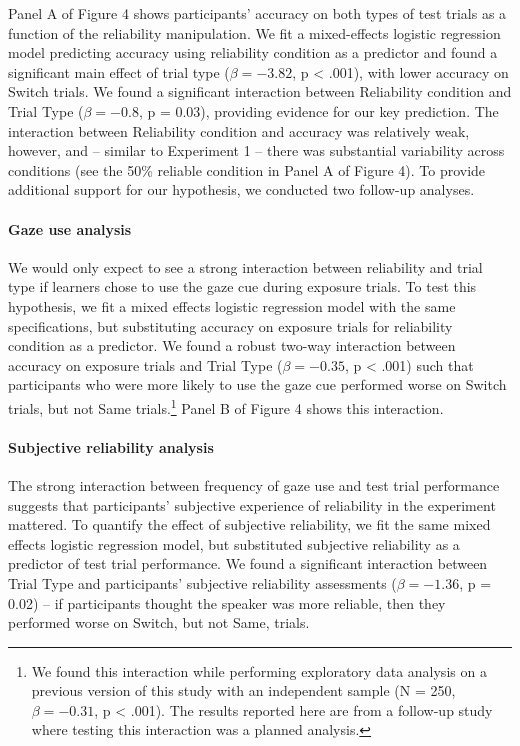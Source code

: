 \documentclass[authoryear, review]{elsarticle}
\begin{document}
Panel A of Figure 4 shows participants' accuracy on both types of test
trials as a function of the reliability manipulation. We fit a
mixed-effects logistic regression model predicting accuracy using
reliability condition as a predictor and found a significant main effect
of trial type (\(\beta = -3.82\), p \textless{} .001), with lower
accuracy on Switch trials. We found a significant interaction between
Reliability condition and Trial Type (\(\beta = -0.8\), p = 0.03),
providing evidence for our key prediction. The interaction between
Reliability condition and accuracy was relatively weak, however, and --
similar to Experiment 1 -- there was substantial variability across
conditions (see the 50\% reliable condition in Panel A of Figure 4). To
provide additional support for our hypothesis, we conducted two
follow-up analyses.

\paragraph{Gaze use analysis}\label{gaze-use-analysis}

We would only expect to see a strong interaction between reliability and
trial type if learners chose to use the gaze cue during exposure trials.
To test this hypothesis, we fit a mixed effects logistic regression
model with the same specifications, but substituting accuracy on
exposure trials for reliability condition as a predictor. We found a
robust two-way interaction between accuracy on exposure trials and Trial
Type (\(\beta = -0.35\), p \textless{} .001) such that participants who
were more likely to use the gaze cue performed worse on Switch trials,
but not Same trials.\footnote{We found this interaction while performing
  exploratory data analysis on a previous version of this study with an
  independent sample (N = 250, \(\beta = -0.31\), p \textless{} .001).
  The results reported here are from a follow-up study where testing
  this interaction was a planned analysis.} Panel B of Figure 4 shows
this interaction.

\paragraph{Subjective reliability
analysis}\label{subjective-reliability-analysis}

The strong interaction between frequency of gaze use and test trial
performance suggests that participants' subjective experience of
reliability in the experiment mattered. To quantify the effect of
subjective reliability, we fit the same mixed effects logistic
regression model, but substituted subjective reliability as a predictor
of test trial performance. We found a significant interaction between
Trial Type and participants' subjective reliability assessments
(\(\beta = -1.36\), p = 0.02) -- if participants thought the speaker was
more reliable, then they performed worse on Switch, but not Same,
trials.
\end{document}
